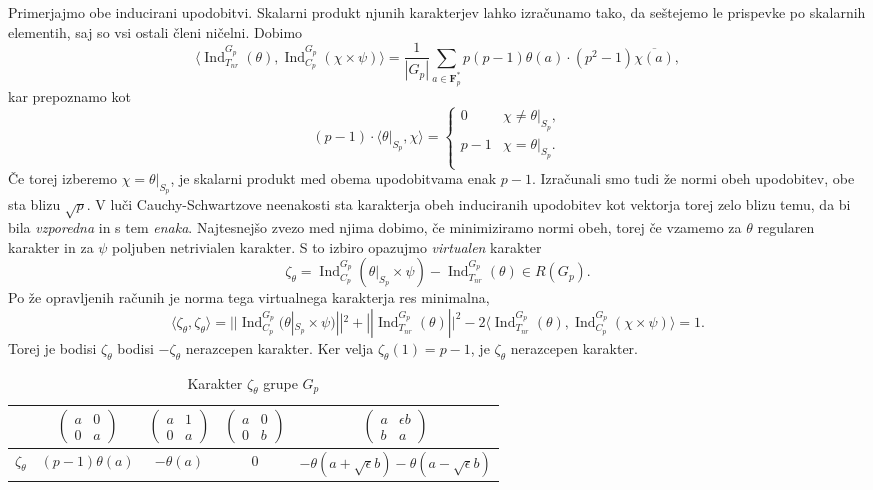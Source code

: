 \documentclass[11pt]{book}
\def\FF{\mathbf{F}}
\DeclareMathOperator\Ind{Ind}
\theoremstyle{definition}
\theoremstyle{zgled}
\theoremstyle{odprtproblem}
\theoremstyle{domacanaloga}
\theoremstyle{izrek}
\begin{document}
Primerjajmo obe inducirani upodobitvi. Skalarni produkt njunih karakterjev lahko izračunamo tako, da seštejemo le prispevke po skalarnih elementih, saj so vsi ostali členi ničelni. Dobimo
\[
{\textstyle \langle \Ind_{T_{nr}}^{G_p}(\theta), \Ind_{C_p}^{G_p}(\chi \times \psi) \rangle}
= \frac{1}{|G_p|} \sum_{a \in \FF_p^*} p(p-1) \theta(a) \cdot (p^2 - 1) \overline{\chi(a)},
\]
kar prepoznamo kot
\[
(p-1) \cdot \langle \theta |_{S_p}, \chi \rangle 
= \begin{cases}
        0 & \chi \neq \theta |_{S_p}, \\
        p-1 & \chi = \theta |_{S_p}. \\
\end{cases}  
\]
Če torej izberemo $\chi = \theta |_{S_p}$, je skalarni produkt med obema upodobitvama enak $p-1$. Izračunali smo tudi že normi obeh upodobitev, obe sta blizu $\sqrt{p}$. V luči Cauchy-Schwartzove neenakosti sta karakterja obeh induciranih upodobitev kot vektorja torej zelo blizu temu, da bi bila \emph{vzporedna} in s tem \emph{enaka}. Najtesnejšo zvezo med njima dobimo, če minimiziramo normi obeh, torej če vzamemo za $\theta$ regularen karakter in za $\psi$ poljuben netrivialen karakter. S to izbiro opazujmo \emph{virtualen} karakter
\[
    \textstyle \zeta_{\theta} = \Ind_{C_p}^{G_p}(\theta |_{S_p} \times \psi) - \Ind_{T_{nr}}^{G_p}(\theta) \in R(G_p).
\]
Po že opravljenih računih je norma tega virtualnega karakterja res minimalna,
\[
    \textstyle \langle \zeta_{\theta}, \zeta_{\theta} \rangle 
    = ||\Ind_{C_p}^{G_p}(\theta |_{S_p} \times \psi)||^2 + ||\Ind_{T_{nr}}^{G_p}(\theta)||^2 - 2 \langle \Ind_{T_{nr}}^{G_p}(\theta), \Ind_{C_p}^{G_p}(\chi \times \psi) \rangle = 1.
\]
Torej je bodisi $\zeta_{\theta}$ bodisi $-\zeta_{\theta}$ nerazcepen karakter. Ker velja $\zeta_{\theta}(1) = p-1$, je $\zeta_{\theta}$ nerazcepen karakter.

\begin{table}[ht]
    \centering
\begin{tabular}{l|*{4}{c}}
    & 
    $\begin{pmatrix}
        a & 0 \\ 0 & a
    \end{pmatrix}$
    &
    $\begin{pmatrix}
        a & 1 \\ 0 & a
    \end{pmatrix}$
    &
    $\begin{pmatrix}
        a & 0 \\ 0 & b
    \end{pmatrix}$
    &
    $\begin{pmatrix}
        a & \epsilon b \\ b & a
    \end{pmatrix}$ \\ \hline
    $\zeta_{\theta}$ & $(p-1) \theta(a)$ & $-\theta(a)$ & $0$ & $- \theta(a + \sqrt{\epsilon} b) - \theta(a - \sqrt{\epsilon} b)$ \\
\end{tabular}
\caption{Karakter $\zeta_{\theta}$ grupe $G_p$}
\end{table}
\end{document}
